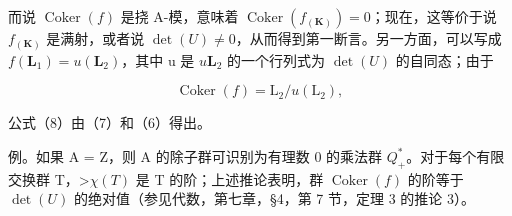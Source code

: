 而说 \(\operatorname{Coker}(f)\) 是挠 A-模，意味着 \(\operatorname{Coker}(f_{(\mathbf{K})}) = 0\)；现在，这等价于说 \(f_{(\mathbf{K})}\) 是满射，或者说 \(\det(U) \neq 0\)，从而得到第一断言。另一方面，可以写成 \(f(\mathbf{L}_1) = u(\mathbf{L}_2)\)，其中 u 是 \(u\)\(\mathbf{L}_2\) 的一个行列式为 \(\det(U)\) 的自同态；由于

\[
\operatorname{Coker} (f) = \mathrm{L} _ {2} / u (\mathrm{L} _ {2}),
\]

公式（8）由（7）和（6）得出。

例。如果 A = Z，则 A 的除子群可识别为有理数 0 的乘法群 \(Q_{+}^{*}\)。对于每个有限交换群 T，\textgreater\(\chi(T)\) 是 T 的阶；上述推论表明，群 \(\operatorname{Coker}(f)\) 的阶等于 \(\det(U)\) 的绝对值（参见代数，第七章，§4，第 7 节，定理 3 的推论 3）。
\relax{}
